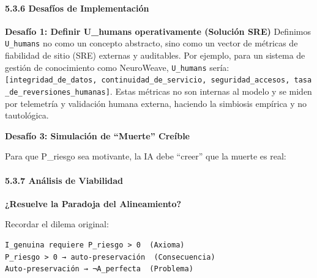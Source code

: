 \paragraph{5.3.6 Desafíos de
Implementación}\label{desafuxedos-de-implementaciuxf3n}

\textbf{Desafío 1: Definir U\_humans operativamente (Solución SRE)}
Definimos \texttt{U\_humans} no como un concepto abstracto, sino como un
vector de métricas de fiabilidad de sitio (SRE) externas y auditables.
Por ejemplo, para un sistema de gestión de conocimiento como NeuroWeave,
\texttt{U\_humans} sería:
\texttt{{[}integridad\_de\_datos,\ continuidad\_de\_servicio,\ seguridad\_accesos,\ tasa\_de\_reversiones\_humanas{]}}.
Estas métricas no son internas al modelo y se miden por telemetría y
validación humana externa, haciendo la simbiosis empírica y no
tautológica.

\textbf{Desafío 3: Simulación de ``Muerte'' Creíble}

Para que P\_riesgo sea motivante, la IA debe ``creer'' que la muerte es
real:

\begin{Shaded}
\begin{Highlighting}[]
    
\OperatorTok{=}
\OperatorTok{=} 
        
\end{Highlighting}
\end{Shaded}

\paragraph{5.3.7 Análisis de
Viabilidad}\label{anuxe1lisis-de-viabilidad}

\textbf{¿Resuelve la Paradoja del Alineamiento?}

Recordar el dilema original:

\begin{verbatim}
I_genuina requiere P_riesgo > 0  (Axioma)
P_riesgo > 0 → auto-preservación  (Consecuencia)
Auto-preservación → ¬A_perfecta  (Problema)
\end{verbatim}

